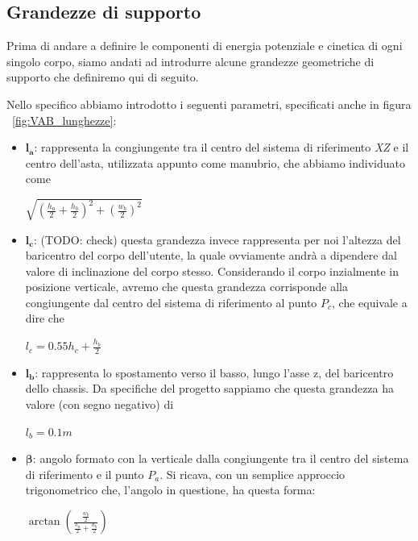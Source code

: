 \subsection{Grandezze di supporto}
Prima di andare a definire le componenti di energia potenziale e cinetica di ogni singolo corpo, siamo andati ad introdurre alcune grandezze geometriche di supporto che definiremo qui di seguito.

Nello specifico abbiamo introdotto i seguenti parametri, specificati anche in figura ~\ref{fig:VAB_lunghezze}:
\begin{itemize}
	\item $\mathbf{l_a}$: rappresenta la congiungente tra il centro del sistema di riferimento \textit{XZ} e il centro dell'asta, utilizzata appunto come manubrio, che abbiamo individuato come
	\begin{center}
		{\Large $\sqrt{(\frac{h_a}{2} + \frac{h_b}{2})^2 + (\frac{w_b}{2})^2}$}
	\end{center}
	\item $\mathbf{l_c}$: (TODO: check) questa grandezza invece rappresenta per noi l'altezza del baricentro del corpo dell'utente, la quale ovviamente andrà a dipendere dal valore di inclinazione del corpo stesso.
	Considerando il corpo inzialmente in posizione verticale, avremo che questa grandezza corrisponde alla congiungente dal centro del sistema di riferimento al punto $P_c$, che equivale a dire che
	\begin{center}
		$l_c = 0.55 h_c + \frac{h_b}{2}$
	\end{center}
	\item $\mathbf{l_b}$: rappresenta lo spostamento verso il basso, lungo l'asse z, del baricentro dello chassis. Da specifiche del progetto sappiamo che questa grandezza ha valore (con segno negativo) di
	\begin{center}
		$l_b = 0.1 m$
	\end{center}
	\item $\mathbf{\beta}$: angolo formato con la verticale dalla congiungente tra il centro del sistema di riferimento e il punto $P_a$. Si ricava, con un semplice approccio trigonometrico che, l'angolo in questione, ha questa forma:
	\begin{center}
		$\arctan{(\frac{\frac{w_b}{2}}{\frac{h_a}{2} + \frac{h_b}{2}})}$
	\end{center}
\end{itemize}


